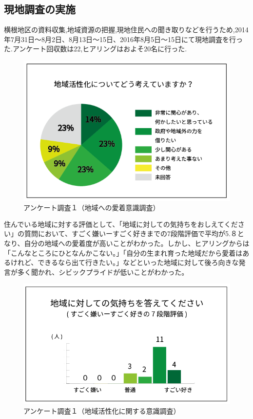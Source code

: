 \documentclass[a4paper]{jsarticle}
\begin{document}
\subsection{現地調査の実施}
横根地区の資料収集,地域資源の把握,現地住民への聞き取りなどを行うため,2014年7月31日〜8月2日、8月13日〜15日、2016年8月5日〜15日にて現地調査を行った.アンケート回収数は22,ヒアリングはおよそ20名に行った.\par

\begin{figure}[H]
  \begin{center}
    \includegraphics[width=0.95\hsize]{./images/02}
    \caption{アンケート調査１（地域への愛着意識調査）}
    \label{fig:tmu_hino}
  \end{center}
\end{figure}

住んでいる地域に対する評価として、「地域に対しての気持ちをおしえてください」の質問において、すごく嫌いーすごく好きまでの7段階評価で平均が5.８となり、自分の地域への愛着度が高いことがわかった。しかし、ヒアリングからは「こんなところにひとなんかこない。」「自分の生まれ育った地域だから愛着はあるけれど、できるなら出て行きたい。」などといった地域に対して後ろ向きな発言が多く聞かれ、シビックプライドが低いことがわかった。\par
\begin{figure}[H]
  \begin{center}
    \includegraphics[width=0.95\hsize]{./images/03}
    \caption{アンケート調査１（地域活性化に関する意識調査）}
    \label{fig:tmu_hino}
  \end{center}
\end{figure}
\end{document}
